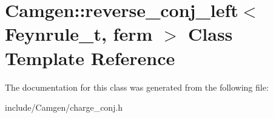 \hypertarget{a00465}{\section{Camgen\-:\-:reverse\-\_\-conj\-\_\-left$<$ Feynrule\-\_\-t, ferm $>$ Class Template Reference}
\label{a00465}
}


The documentation for this class was generated from the following file\-:\begin{DoxyCompactItemize}
\item 
include/\-Camgen/charge\-\_\-conj.\-h\end{DoxyCompactItemize}
